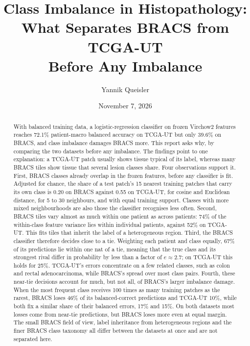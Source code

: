\documentclass[11pt]{article}
\title{Class Imbalance in Histopathology:\\What Separates {BRACS} from {TCGA-UT}\\Before Any Imbalance}
\author{Yannik Queisler}
\date{November 7, 2026}
\begin{document}
\raggedbottom
{}
\setlength{\emergencystretch}{2em}
\maketitle
\begin{abstract}
\noindent With balanced training data, a logistic-regression classifier on frozen Virchow2 features reaches 72.1\% patient-macro balanced accuracy on TCGA-UT but only 39.6\% on BRACS, and class imbalance damages BRACS more. This report asks why, by comparing the two datasets before any imbalance. The findings point to one explanation: a TCGA-UT patch usually shows tissue typical of its label, whereas many BRACS tiles show tissue that several lesion classes share. Four observations support it. First, BRACS classes already overlap in the frozen features, before any classifier is fit. Adjusted for chance, the share of a test patch's 15 nearest training patches that carry its own class is 0.20 on BRACS against 0.55 on TCGA-UT, for cosine and Euclidean distance, for 5 to 30 neighbours, and with equal training support. Classes with more mixed neighbourhoods are also those the classifier recognises less often. Second, BRACS tiles vary almost as much within one patient as across patients: 74\% of the within-class feature variance lies within individual patients, against 52\% on TCGA-UT. This fits tiles that inherit the label of a heterogeneous region. Third, the BRACS classifier therefore decides close to a tie. Weighting each patient and class equally, 67\% of its predictions lie within one nat of a tie, meaning that the true class and its strongest rival differ in probability by less than a factor of $e\approx2.7$; on TCGA-UT this holds for 25\%. TCGA-UT's errors concentrate on a few related classes, such as colon and rectal adenocarcinoma, while BRACS's spread over most class pairs. Fourth, these near-tie decisions account for much, but not all, of BRACS's larger imbalance damage. When the most frequent class receives 100 times as many training patches as the rarest, BRACS loses 46\% of its balanced-correct predictions and TCGA-UT 10\%, while both fix a similar share of their balanced errors, 17\% and 15\%. On both datasets most losses come from near-tie predictions, but BRACS loses more even at equal margin. The small BRACS field of view, label inheritance from heterogeneous regions and the finer BRACS class taxonomy all differ between the datasets at once and are not separated here.
\end{abstract}
\end{document}
